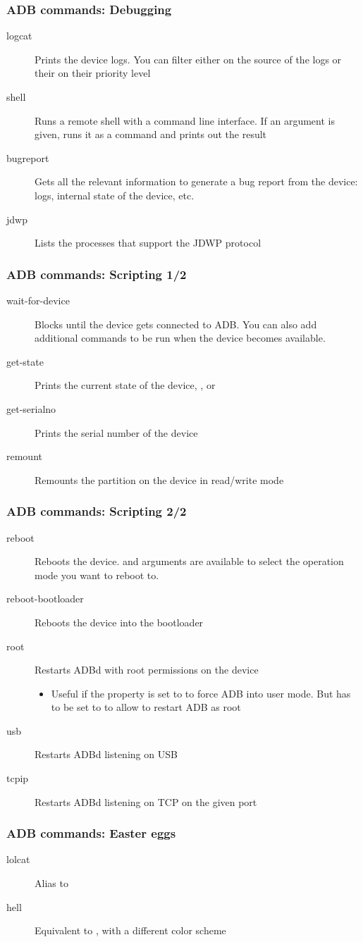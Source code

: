 \begin{frame}
  \frametitle{ADB commands: Debugging}
  \begin{description}
  \item[logcat] Prints the device logs. You can filter either on
    the source of the logs or their on their priority level
  \item[shell] Runs a remote shell with a command line interface. If an
    argument is given, runs it as a command and prints out the result
  \item[bugreport] Gets all the relevant information to generate a
    bug report from the device: logs, internal state of the device, etc.
  \item[jdwp] Lists the processes that support the JDWP protocol
  \end{description}
\end{frame}

\begin{frame}
  \frametitle{ADB commands: Scripting 1/2}
  \begin{description}
  \item[wait-for-device] Blocks until the device gets connected to
    ADB. You can also add additional commands to
    be run when the device becomes available.
  \item[get-state] Prints the current state of the device,
    ,  or 
  \item[get-serialno] Prints the serial number of the device
  \item[remount] Remounts the  partition on the device
    in read/write mode
  \end{description}
\end{frame}

\begin{frame}
  \frametitle{ADB commands: Scripting 2/2}
  \begin{description}
  \item[reboot] Reboots the device.  and
     arguments are available to select the operation
    mode you want to reboot to.
  \item[reboot-bootloader] Reboots the device into the bootloader
  \item[root] Restarts ADBd with root permissions on the device
    \begin{itemize}
    \item Useful if the  property is set to 
      to force ADB into user mode. But  has to
      be set to  to allow to restart ADB as root
    \end{itemize}
  \item[usb] Restarts ADBd listening on USB
  \item[tcpip] Restarts ADBd listening on TCP on the given port
  \end{description}
\end{frame}

\begin{frame}
  \frametitle{ADB commands: Easter eggs}
  \begin{description}
  \item[lolcat] Alias to  
  \item[hell] Equivalent to , with a different
    color scheme
  \end{description}
\end{frame}
